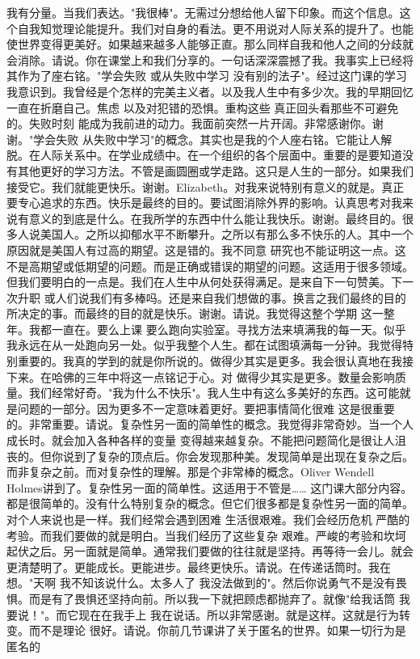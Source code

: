 我有分量。当我们表达。"我很棒"。无需过分想给他人留下印象。而这个信息。这个自我知觉理论能提升。我们对自身的看法。更不用说对人际关系的提升了。也能使世界变得更美好。如果越来越多人能够正直。那么同样自我和他人之间的分歧就会消除。请说。你在课堂上和我们分享的。一句话深深震撼了我。我事实上已经将其作为了座右铭。"学会失败 或从失败中学习 没有别的法子"。经过这门课的学习 我意识到。我曾经是个怎样的完美主义者。以及我人生中有多少次。我的早期回忆一直在折磨自己。焦虑 以及对犯错的恐惧。重构这些 真正回头看那些不可避免的。失败时刻 能成为我前进的动力。我面前突然一片开阔。非常感谢你。谢谢。"学会失败 从失败中学习"的概念。其实也是我的个人座右铭。它能让人解脱。在人际关系中。在学业成绩中。在一个组织的各个层面中。重要的是要知道没有其他更好的学习方法。不管是画圆圈或学走路。这只是人生的一部分。如果我们接受它。我们就能更快乐。谢谢。Elizabeth。对我来说特别有意义的就是。真正要专心追求的东西。快乐是最终的目的。要试图消除外界的影响。认真思考对我来说有意义的到底是什么。在我所学的东西中什么能让我快乐。谢谢。最终目的。很多人说美国人。之所以抑郁水平不断攀升。之所以有那么多不快乐的人。其中一个原因就是美国人有过高的期望。这是错的。我不同意 研究也不能证明这一点。这不是高期望或低期望的问题。而是正确或错误的期望的问题。这适用于很多领域。但我们要明白的一点是。我们在人生中从何处获得满足。是来自下一句赞美。下一次升职 或人们说我们有多棒吗。还是来自我们想做的事。换言之我们最终的目的所决定的事。而最终的目的就是快乐。谢谢。请说。我觉得这整个学期 这一整年。我都一直在。要么上课 要么跑向实验室。寻找方法来填满我的每一天。似乎我永远在从一处跑向另一处。似乎我整个人生。都在试图填满每一分钟。我觉得特别重要的。我真的学到的就是你所说的。做得少其实是更多。我会很认真地在我接下来。在哈佛的三年中将这一点铭记于心。对 做得少其实是更多。数量会影响质量。我们经常好奇。"我为什么不快乐"。我人生中有这么多美好的东西。这可能就是问题的一部分。因为更多不一定意味着更好。要把事情简化很难 这是很重要的。非常重要。请说。复杂性另一面的简单性的概念。我觉得非常奇妙。当一个人成长时。就会加入各种各样的变量 变得越来越复杂。不能把问题简化是很让人沮丧的。但你说到了复杂的顶点后。你会发现那种美。发现简单是出现在复杂之后。而非复杂之前。而对复杂性的理解。那是个非常棒的概念。Oliver Wendell Holmes讲到了。复杂性另一面的简单性。这适用于不管是…… 这门课大部分内容。都是很简单的。没有什么特别复杂的概念。但它们很多都是复杂性另一面的简单。对个人来说也是一样。我们经常会遇到困难 生活很艰难。我们会经历危机 严酷的考验。而我们要做的就是明白。当我们经历了这些复杂 艰难。严峻的考验和坎坷起伏之后。另一面就是简单。通常我们要做的往往就是坚持。再等待一会儿。就会更清楚明了。更能成长。更能进步。最终更快乐。请说。在传递话筒时。我在想。"天啊 我不知该说什么。太多人了 我没法做到的"。然后你说勇气不是没有畏惧。而是有了畏惧还坚持向前。所以我一下就把顾虑都抛弃了。就像"给我话筒 我要说！"。而它现在在我手上 我在说话。所以非常感谢。就是这样。这就是行为转变。而不是理论 很好。请说。你前几节课讲了关于匿名的世界。如果一切行为是匿名的 